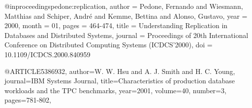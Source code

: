 @inproceedings{pedone:replication,
author = {Pedone, Fernando and Wiesmann, Matthias and Schiper, André and Kemme, Bettina and Alonso, Gustavo},
year = {2000},
month = {01},
pages = {464-474},
title = {Understanding Replication in Databases and Distributed Systems},
journal = {Proceedings of 20th International Conference on Distributed Computing Systems (ICDCS'2000)},
doi = {10.1109/ICDCS.2000.840959}
}


@ARTICLE{5386932, author={W. W. {Hsu} and A. J. {Smith} and H. C. {Young}}, journal={IBM Systems Journal}, title={Characteristics of production database workloads and the TPC benchmarks}, year={2001}, volume={40}, number={3}, pages={781-802},}
